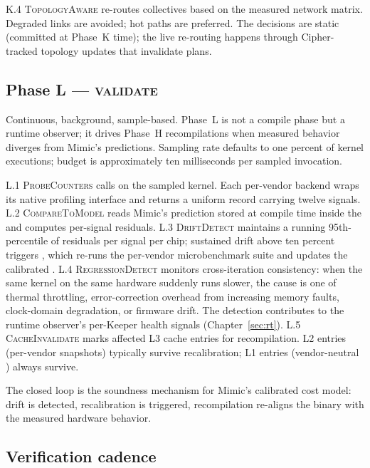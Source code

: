K.4 \textsc{TopologyAware} re-routes collectives based on the measured network matrix.
Degraded links are avoided; hot paths are preferred.
The decisions are static (committed at Phase~K time); the live re-routing happens through Cipher-tracked topology updates that invalidate plans.

\subsection{Phase L --- \textsc{validate}}
\label{sec:forge-phase-l}

Continuous, background, sample-based.
Phase~L is not a compile phase but a runtime observer; it drives Phase~H recompilations when measured behavior diverges from Mimic's predictions.
Sampling rate defaults to one percent of kernel executions; budget is approximately ten milliseconds per sampled invocation.

L.1 \textsc{ProbeCounters} calls  on the sampled kernel.
Each per-vendor backend wraps its native profiling interface and returns a uniform  record carrying twelve signals.
L.2 \textsc{CompareToModel} reads Mimic's prediction stored at compile time inside the  and computes per-signal residuals.
L.3 \textsc{DriftDetect} maintains a running 95th-percentile of residuals per signal per chip; sustained drift above ten percent triggers , which re-runs the per-vendor microbenchmark suite and updates the calibrated .
L.4 \textsc{RegressionDetect} monitors cross-iteration consistency: when the same kernel on the same hardware suddenly runs slower, the cause is one of thermal throttling, error-correction overhead from increasing memory faults, clock-domain degradation, or firmware drift.
The detection contributes to the runtime observer's per-Keeper health signals (Chapter~\ref{sec:rt}).
L.5 \textsc{CacheInvalidate} marks affected L3 cache entries for recompilation.
L2 entries (per-vendor  snapshots) typically survive recalibration; L1 entries (vendor-neutral ) always survive.

The closed loop is the soundness mechanism for Mimic's calibrated cost model: drift is detected, recalibration is triggered, recompilation re-aligns the binary with the measured hardware behavior.

\subsection{Verification cadence}
\label{sec:forge-verification}

